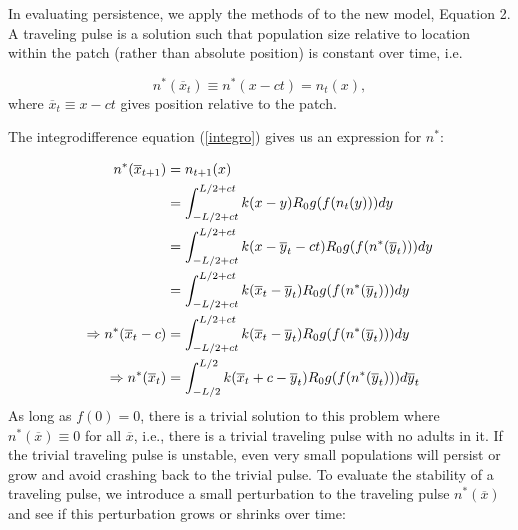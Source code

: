 \documentclass[12pt,english]{article}
\begin{document}
In evaluating persistence, we apply the methods of \citet{ZhouKot2011} to the new model, Equation 2.  A traveling pulse is a solution such that population size relative to location within the patch (rather than absolute position) is constant over time, i.e. 

\begin{equation*}
n^*(\overline{x}_t)\equiv n^*(x-ct)=n_t(x),   \label{trav} 
\end{equation*}
where $\overline{x}_t\equiv x-ct$ gives position relative to the patch. 

The integrodifference equation (\ref{integro}) gives us an expression for $n^*$:

\begin{align}
n^*(\overline{x}_{t+1})&=n_{t+1}(x) \notag
\\ &=\int_{-L/2+ct}^{L/2+ct}k(x-y)R_0g(f(n_t(y)))dy \notag
\\ &=\int_{-L/2+ct}^{L/2+ct}k(x-\overline{y}_t-ct)R_0g(f(n^*(\overline{y}_t)))dy \notag
\\ &=\int_{-L/2+ct}^{L/2+ct}k(\overline{x}_t-\overline{y}_t)R_0g(f(n^*(\overline{y}_t)))dy \notag
\\ \Rightarrow n^*(\overline{x}_t-c)&=\int_{-L/2+ct}^{L/2+ct}k(\overline{x}_t-\overline{y}_t)R_0g(f(n^*(\overline{y}_t)))dy \notag
\\ \Rightarrow n^*(\overline{x}_t)&=\int_{-L/2}^{L/2}k(\overline{x}_t+c-\overline{y}_t)R_0g(f(n^*(\overline{y}_t)))d\overline y_t  \label{pulse}
\end{align}
As long as $f(0)=0$, there is a trivial solution to this problem where $n^*(\overline{x})\equiv 0$ for all $\overline{x}$, i.e., there is a trivial traveling pulse with no adults in it.  If the trivial traveling pulse is unstable, even very small populations will persist or grow and avoid crashing back to the trivial pulse.  To evaluate the stability of a traveling pulse, we introduce a small perturbation to the traveling pulse $n^*(\overline{x})$ and see if this perturbation grows or shrinks over time:
\end{document}
